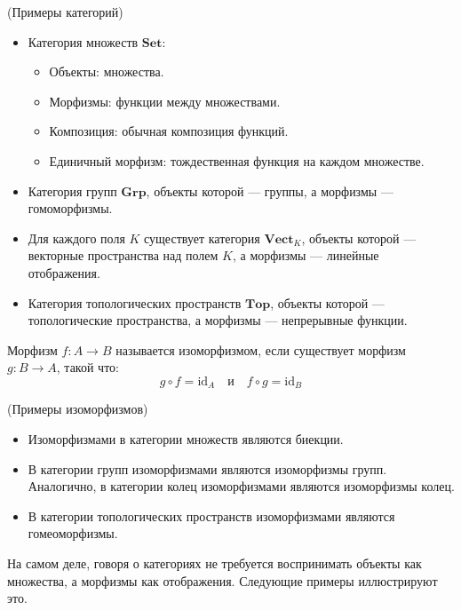 \documentclass[document]{subfiles}
\begin{document}
\begin{example}(Примеры категорий)
    \begin{itemize}
        \item Категория множеств $\mathbf{Set}$:
            \begin{itemize}
            \item Объекты: множества.
            \item Морфизмы: функции между множествами.
            \item Композиция: обычная композиция функций.
            \item Единичный морфизм: тождественная функция на каждом множестве.
            \end{itemize}
        \item Категория групп $\mathbf{Grp}$, объекты которой --- группы, а морфизмы --- гомоморфизмы.
        \item Для каждого поля $K$ существует категория $\mathbf{Vect}_K$, объекты которой --- векторные пространства над полем $K$, а морфизмы --- линейные отображения.
        \item Категория топологических пространств $\mathbf{Top}$, объекты которой --- топологические пространства, а морфизмы --- непрерывные функции.
    \end{itemize}
\end{example}

\begin{definition}
    Морфизм $f: A \to B$ называется изоморфизмом, если существует морфизм $g: B \to A$, такой что:
    \[g \circ f = \text{id}_A \quad \text{и} \quad f \circ g = \text{id}_B\]
\end{definition}

\begin{example}(Примеры изоморфизмов)
    \begin{itemize}
        \item Изоморфизмами в категории множеств являются биекции.
        \item В категории групп изоморфизмами являются изоморфизмы групп. Аналогично, в категории колец изоморфизмами являются изоморфизмы колец.
        \item В категории топологических пространств изоморфизмами являются гомеоморфизмы.
    \end{itemize}
\end{example}

На самом деле, говоря о категориях не требуется воспринимать объекты как множества, а морфизмы как отображения. Следующие примеры иллюстрируют это.
\end{document}
